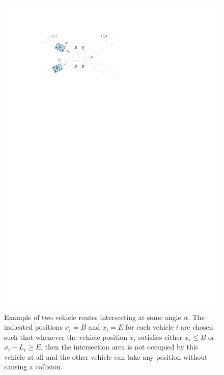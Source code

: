 \documentclass[a4paper]{report}
\theoremstyle{definition}
\theoremstyle{plain}
\begin{document}
\begin{figure}[b]
  \centering
  \includegraphics[scale=1.1]{figures/intersection-non-axis-aligned-annotated}
  \caption{Example of two vehicle routes intersecting at some angle $\alpha$. The
    indicated positions $x_{i} = B$ and $x_{i} = E$ for each vehicle $i$ are
    chosen such that whenever the vehicle position $x_{i}$ satisfies either
    $x_{i} \leq B$ or $x_{i} - L_{i} \geq E$, then the intersection area is not
    occupied by this vehicle at all and the other vehicle can take any position
    without causing a collision.}%
  \label{fig:intersection-non-axis-aligned}
\end{figure}
\end{document}
